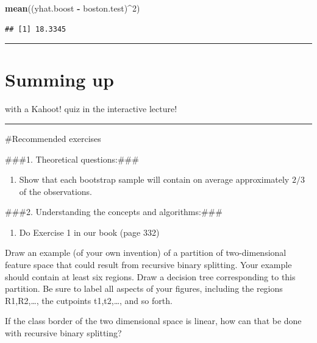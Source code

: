 \documentclass[]{article}
\newenvironment{Shaded}{\begin{snugshade}}{\end{snugshade}}
\newcommand{\DecValTok}[1]{\textcolor[rgb]{0.00,0.00,0.81}{#1}}
\newcommand{\KeywordTok}[1]{\textcolor[rgb]{0.13,0.29,0.53}{\textbf{#1}}}
\newcommand{\NormalTok}[1]{#1}
\newcommand{\OperatorTok}[1]{\textcolor[rgb]{0.81,0.36,0.00}{\textbf{#1}}}
\newcommand{\StringTok}[1]{\textcolor[rgb]{0.31,0.60,0.02}{#1}}
\providecommand{\tightlist}{%
  \setlength{\itemsep}{0pt}\setlength{\parskip}{0pt}}
\begin{document}
\begin{Shaded}
\begin{Highlighting}[]
\KeywordTok{mean}\NormalTok{((yhat.boost }\OperatorTok{-}\StringTok{ }\NormalTok{boston.test)}\OperatorTok{^}\DecValTok{2}\NormalTok{)}
\end{Highlighting}
\end{Shaded}

\begin{verbatim}
## [1] 18.3345
\end{verbatim}

\begin{center}\rule{0.5\linewidth}{\linethickness}\end{center}

\hypertarget{summing-up}{%
\section{Summing up }\label{summing-up}}

with a Kahoot! quiz in the interactive lecture!

\begin{center}\rule{0.5\linewidth}{\linethickness}\end{center}

\#Recommended exercises

\#\#\#1. Theoretical questions:\#\#\#

\begin{enumerate}
\def\labelenumi{\alph{enumi})}
\tightlist
\item
  Show that each bootstrap sample will contain on average approximately
  \(2/3\) of the observations.
\end{enumerate}

\#\#\#2. Understanding the concepts and algorithms:\#\#\#

\begin{enumerate}
\def\labelenumi{\alph{enumi})}
\tightlist
\item
  Do Exercise 1 in our book (page 332)
\end{enumerate}

Draw an example (of your own invention) of a partition of
two-dimensional feature space that could result from recursive binary
splitting. Your example should contain at least six regions. Draw a
decision tree corresponding to this partition. Be sure to label all
aspects of your figures, including the regions R1,R2,\ldots{}, the
cutpoints t1,t2,\ldots{}, and so forth.

If the class border of the two dimensional space is linear, how can that
be done with recursive binary splitting?
\end{document}
